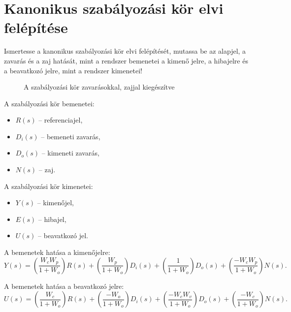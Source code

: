 \section{Kanonikus szabályozási kör elvi felépítése}

\begin{about}
  Ismertesse a kanonikus szabályozási kör elvi felépítését, mutassa be az
  alapjel, a zavarás és a zaj hatását, mint a rendszer bemenetei a kimenő jelre,
  a hibajelre és a beavatkozó jelre, mint a rendszer kimenetei!
\end{about}

\begin{figure}[htb]
  \centering
  
  \caption{A szabályozási kör zavarásokkal, zajjal kiegészítve}
  \label{fig:control-loop-disturbances}
\end{figure}

\begin{multicols}{2}
  A szabályozási kör bemenetei:
  \begin{itemize}
    \item $R(s)$ -- referenciajel,
    \item $D_i(s)$ -- bemeneti zavarás,
    \item $D_o(s)$ -- kimeneti zavarás,
    \item $N(s)$ -- zaj.
  \end{itemize}

  A szabályozási kör kimenetei:
  \begin{itemize}
    \item $Y(s)$ -- kimenőjel,
    \item $E(s)$ -- hibajel,
    \item $U(s)$ -- beavatkozó jel.
  \end{itemize}
\end{multicols}

A bemenetek hatása a kimenőjelre:
\begin{equation}
  Y(s)
  = \left( \frac{W_c W_p} {1 + W_o} \right) R(s)
  + \left( \frac{W_p}     {1 + W_o} \right) D_i(s)
  + \left( \frac{1}       {1 + W_o} \right) D_o(s)
  + \left( \frac{-W_c W_p}{1 + W_o} \right) N(s)
  .
  \label{eq:disturbances-Y}
\end{equation}

A bemenetek hatása a beavatkozó jelre:
\begin{equation}
  U(s)
  = \left( \frac{W_c}     {1 + W_o} \right) R(s)
  + \left( \frac{-W_o}    {1 + W_o} \right) D_i(s)
  + \left( \frac{-W_c W_v}{1 + W_o} \right) D_o(s)
  + \left( \frac{-W_c}    {1 + W_o} \right) N(s)
  .
  \label{eq:disturbances-U}
\end{equation}

